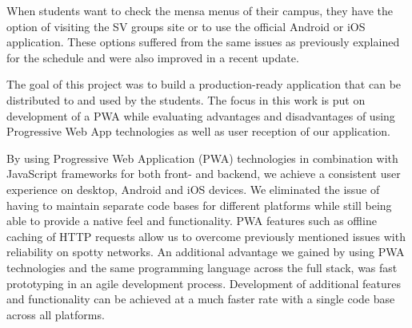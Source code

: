 \begin{markdown}
When students want to check the mensa menus of their campus, they have the option of visiting the SV groups site \cite{SVSite} or to use the official Android or iOS application. These options suffered from the same issues as previously explained for the schedule and were also improved in a recent update.

The goal of this project was to build a production-ready application that can be distributed to and used by the students. The focus in this work is put on development of a PWA while evaluating advantages and disadvantages of using Progressive Web App technologies as well as user reception of our application.

By using Progressive Web Application (PWA) technologies \cite{PWA} in combination with JavaScript frameworks for both front- and backend, we achieve a consistent user experience on desktop, Android and iOS devices. We eliminated the issue of having to maintain separate code bases for different platforms while still being able to provide a native feel and functionality. PWA features such as offline caching of HTTP requests allow us to overcome previously mentioned issues with reliability on spotty networks. An additional advantage we gained by using PWA technologies and the same programming language across the full stack, was fast prototyping in an agile development process. Development of additional features and functionality can be achieved at a much faster rate with a single code base across all platforms.

\newpage

\end{markdown}
